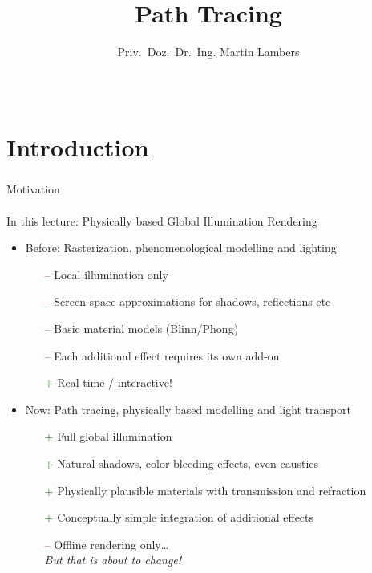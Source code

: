 \documentclass[utf8,stillsansserifmath,fleqn,t]{beamer}
\title[Path Tracing]{Path Tracing}
\author[M. Lambers]%
{Priv.~Doz.~Dr.~Ing. Martin Lambers}
\institute[~]{~}
\date{~}
\begin{document}
\begin{frame}
\titlepage
\end{frame}


\section{Introduction}

\begin{frame}
\frametitle{\insertsection}
Motivation\\~\\
In this lecture: Physically based Global Illumination Rendering
\begin{itemize}
\item Before: Rasterization, phenomenological modelling and lighting
    \begin{itemize}
    \item[\textcolor{DarkRed}{--}] Local illumination only
    \item[\textcolor{DarkRed}{--}] Screen-space approximations for shadows, reflections etc
    \item[\textcolor{DarkRed}{--}] Basic material models (Blinn/Phong)
    \item[\textcolor{DarkRed}{--}] Each additional effect requires its own add-on
    \item[\textcolor{DarkGreen}{+}] Real time / interactive!
    \end{itemize}
\item Now: Path tracing, physically based modelling and light transport
    \begin{itemize}
    \item[\textcolor{DarkGreen}{+}] Full global illumination
    \item[\textcolor{DarkGreen}{+}] Natural shadows, color bleeding effects, even caustics
    \item[\textcolor{DarkGreen}{+}] Physically plausible materials with transmission and refraction
    \item[\textcolor{DarkGreen}{+}] Conceptually simple integration of additional effects
    \item[\textcolor{DarkRed}{--}] Offline rendering only\ldots\\
            \emph{But that is about to change!}
    \end{itemize}    
\end{itemize}
\end{frame}
\end{document}
